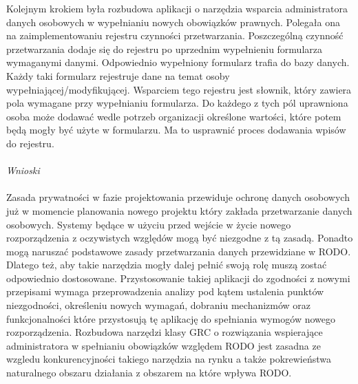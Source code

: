\documentclass[en, noamssymb]{mgr}
\begin{document}
\indent Kolejnym krokiem była rozbudowa aplikacji o narzędzia wsparcia administratora danych osobowych w wypełnianiu nowych obowiązków prawnych. Polegała ona na zaimplementowaniu rejestru czynności przetwarzania. Poszczególną czynność przetwarzania dodaje się do rejestru po uprzednim wypełnieniu formularza wymaganymi danymi. Odpowiednio wypełniony formularz trafia do bazy danych. Każdy taki formularz rejestruje dane na temat osoby wypełniającej/modyfikującej. Wsparciem tego rejestru jest słownik, który zawiera pola wymagane przy wypełnianiu formularza. Do każdego z tych pól uprawniona osoba może dodawać wedle potrzeb organizacji określone wartości, które potem będą mogły być użyte w formularzu. Ma to usprawnić proces dodawania wpisów do rejestru.    \\ \\

\indent \textit{Wnioski} \\ \\
\indent Zasada prywatności w fazie projektowania przewiduje ochronę danych osobowych już  w momencie planowania nowego projektu który zakłada przetwarzanie danych osobowych. Systemy będące w użyciu przed wejście w życie nowego rozporządzenia z oczywistych względów mogą być niezgodne z tą zasadą. Ponadto mogą naruszać podstawowe zasady przetwarzania danych przewidziane w RODO. Dlatego też, aby takie narzędzia mogły dalej pełnić swoją rolę muszą zostać odpowiednio dostosowane. Przystosowanie takiej aplikacji do zgodności z nowymi przepisami wymaga przeprowadzenia analizy pod kątem ustalenia punktów niezgodności, określeniu nowych wymagań, dobraniu mechanizmów oraz funkcjonalności które przystosują tę aplikację do spełniania wymogów nowego rozporządzenia. Rozbudowa narzędzi klasy GRC o rozwiązania wspierające administratora w spełnianiu obowiązków względem RODO jest zasadna ze wzgledu konkurencyjności takiego narzędzia na rynku a także pokrewieństwa naturalnego obszaru działania z obszarem na które wpływa RODO. 


\listoffigures
\end{document}
